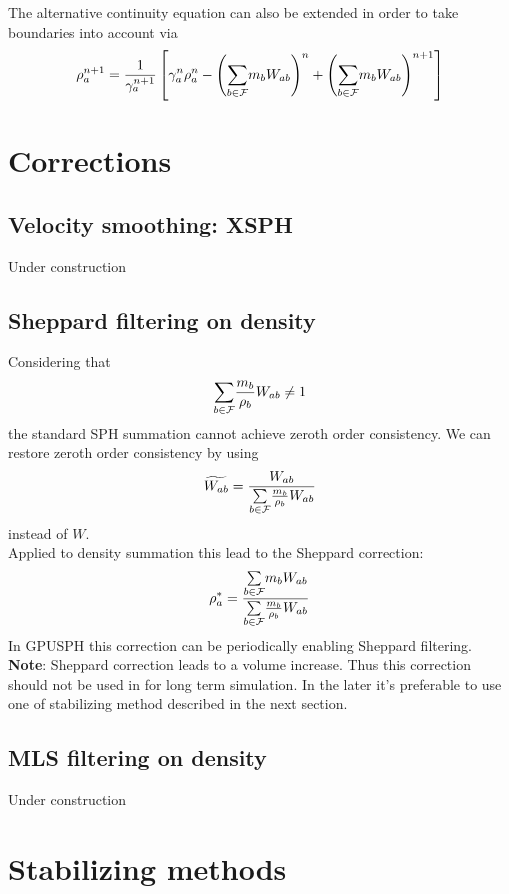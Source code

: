 \documentclass{../GPUSPHtemplate}
\begin{document}
The alternative continuity equation can also be extended in order to
take boundaries into account via
\begin{equation}
\rho_a^{n+1} = \frac{1}{\gamma_a^{n+1}}\left[\gamma_a^n \rho_a^n - \left(\underset{b \in \mathcal{F}}{\sum} m_b
W_{ab}\right)^n + \left(\underset{b \in \mathcal{F}}{\sum}
m_b W_{ab}\right)^{n+1}\right]
\label{e:sa:sumrho-time}
\end{equation}

\section{Corrections}
\subsection{Velocity smoothing: XSPH}
Under construction

\subsection{Sheppard filtering on density}
Considering that 
\begin{equation*}
\underset{b \in \mathcal{F}}{\sum} \frac{m_b}{\rho_b} W_{ab} \neq 1
\end{equation*}
the standard SPH summation cannot achieve zeroth order consistency. We can restore zeroth
order consistency by using 
\begin{equation*}
\widetilde{W_{ab}}=\frac{W_{ab}}{\underset{b \in \mathcal{F}}{\sum}  \frac{m_b}{\rho_b} W_{ab}}
\end{equation*}
instead of $W$.\\
Applied to density summation this lead to the Sheppard correction:
\begin{equation}
{\rho}_a^*=\frac{\underset{b \in \mathcal{F}}{\sum} m_b W_{ab}}{\underset{b \in \mathcal{F}}{\sum}  \frac{m_b}{\rho_b} W_{ab}}
\end{equation}
\label{e:corr:sheppard}
In GPUSPH this correction can be periodically enabling Sheppard filtering.
\textbf{Note}: Sheppard correction leads to a volume increase. Thus this correction should not be used in
for long term simulation. In the later it's preferable to use one of stabilizing method described in the next
section.

\subsection{MLS filtering on density}
Under construction

\section{Stabilizing methods}
\end{document}
